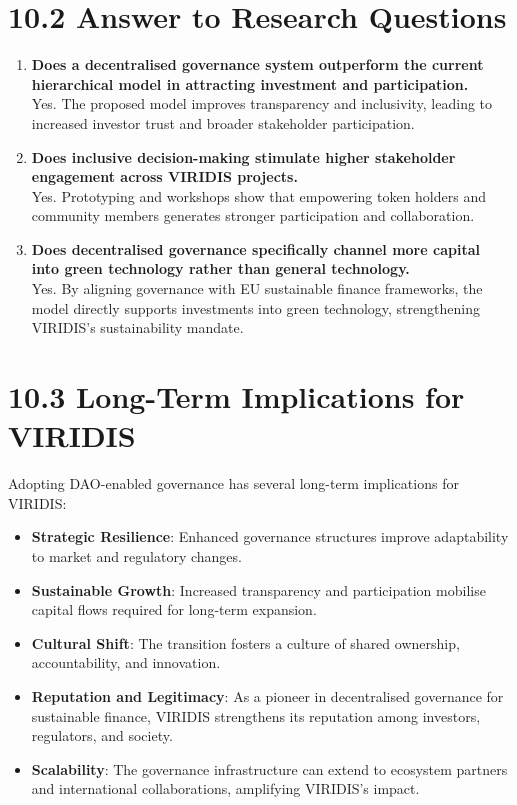 \documentclass[
  english,
  12pt,
  oneside,
  open=any]{scrbook}
\providecommand{\tightlist}{%
  \setlength{\itemsep}{0pt}\setlength{\parskip}{0pt}}\usepackage{longtable,booktabs,array}
\begin{document}
\section{10.2 Answer to Research Questions}\label{sec-rq-answers}

\begin{enumerate}
\def\labelenumi{\arabic{enumi}.}
\item
  \textbf{Does a decentralised governance system outperform the current
  hierarchical model in attracting investment and participation.}\\
  Yes. The proposed model improves transparency and inclusivity, leading
  to increased investor trust and broader stakeholder participation.
\item
  \textbf{Does inclusive decision-making stimulate higher stakeholder
  engagement across VIRIDIS projects.}\\
  Yes. Prototyping and workshops show that empowering token holders and
  community members generates stronger participation and collaboration.
\item
  \textbf{Does decentralised governance specifically channel more
  capital into green technology rather than general technology.}\\
  Yes. By aligning governance with EU sustainable finance frameworks,
  the model directly supports investments into green technology,
  strengthening VIRIDIS's sustainability mandate.
\end{enumerate}

\section{10.3 Long-Term Implications for
VIRIDIS}\label{sec-implications}

Adopting DAO-enabled governance has several long-term implications for
VIRIDIS:

\begin{itemize}
\tightlist
\item
  \textbf{Strategic Resilience}: Enhanced governance structures improve
  adaptability to market and regulatory changes.\\
\item
  \textbf{Sustainable Growth}: Increased transparency and participation
  mobilise capital flows required for long-term expansion.\\
\item
  \textbf{Cultural Shift}: The transition fosters a culture of shared
  ownership, accountability, and innovation.\\
\item
  \textbf{Reputation and Legitimacy}: As a pioneer in decentralised
  governance for sustainable finance, VIRIDIS strengthens its reputation
  among investors, regulators, and society.\\
\item
  \textbf{Scalability}: The governance infrastructure can extend to
  ecosystem partners and international collaborations, amplifying
  VIRIDIS's impact.
\end{itemize}
\end{document}
